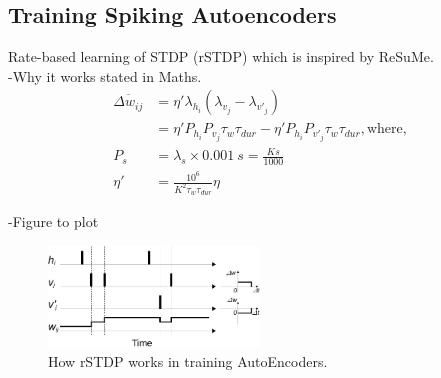 \documentclass[conference]{IEEEtran}
\begin{document}
\subsection{Training Spiking Autoencoders}
Rate-based learning of STDP (rSTDP) which is inspired by ReSuMe.\\
-Why it works stated in Maths.\\
	\begin{equation}
	\begin{aligned}
	\overline{\Delta w_{ij}} &= \eta' \lambda_{h_i}(\lambda_{v_j} - \lambda_{v'_j})\\
	&=\eta'P_{h_i}P_{v_j}\tau_{w} \tau_{dur} - \eta'P_{h_i}P_{v'_j}\tau_{w} \tau_{dur}, \textrm{where,}\\
	P_{s} &= \lambda_{s} \times 0.001~s = \frac{K s}{1000}\\
	\eta' &= \frac{10^6}{K^2 \tau_{w} \tau_{dur}} \eta
	\end{aligned}
	\end{equation}
	
-Figure to plot
	\begin{figure}
		\centering
		\includegraphics[width=0.5\textwidth]{rSTDP}
		\caption{How rSTDP works in training AutoEncoders.}
		\label{fig:rSTDP}
	\end{figure}
\end{document}
